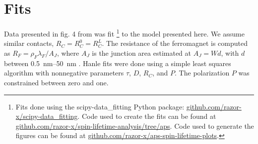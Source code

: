 \section{Fits}
\label{s:fits}

Data presented in fig. 4 from \cite{PhysRevLett.105.167202}
was fit
\footnote{
  Fits done using the scipy-data\_fitting Python package:
  \href{https://github.com/razor-x/scipy-data_fitting}{github.com/razor-x/scipy-data\_fitting}.
  Code used to create the fits can be found at
  \href{https://github.com/razor-x/spin-lifetime-analysis}{github.com/razor-x/spin-lifetime-analysis/tree/aps}.
  Code used to generate the figures can be found at
  \href{https://github.com/razor-x/aps-spin-lifetime-plots}{github.com/razor-x/aps-spin-lifetime-plots}.
}
\cite{Hunter:2007}
to the model presented here.
We assume similar contacts, $R_C = R_C^0 = R_C^L$.
The resistance of the ferromagnet  is computed as
$R_F = ρ_F λ_F / A_J$,
where $A_J$ is the junction area estimated at $A_J = W d$,
with $d$ between \SIrange[range-phrase={ and }]{0.5}{50}{\nano \meter}
\cite{PhysRevLett.105.167202}.
Hanle fits were done using a simple least squares algorithm
with nonnegative parameters $τ$, $D$, $R_C$, and $P$.
The polarization $P$ was constrained between zero and one.

